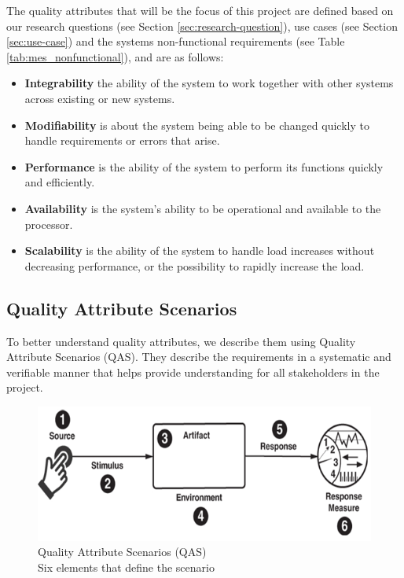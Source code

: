 The quality attributes that will be the focus of this project are defined based on our research questions (see Section \ref{sec:research-question}), use cases (see Section \ref{sec:use-case}) and the systems non-functional requirements (see Table \ref{tab:mes_nonfunctional}), and are as follows:
\begin{itemize}
    \item \textbf{Integrability} the ability of the system to work together with other systems across existing or new systems.
    \item \textbf{Modifiability} is about the system being able to be changed quickly to handle requirements or errors that arise.
    \item \textbf{Performance} is the ability of the system to perform its functions quickly and efficiently.
    \item \textbf{Availability} is the system's ability to be operational and available to the processor.
     \item \textbf{Scalability} is the ability of the system to handle load increases without decreasing performance, or the possibility to rapidly increase the load.
\end{itemize}





\subsection{Quality Attribute Scenarios}
To better understand quality attributes, we describe them using Quality Attribute Scenarios (QAS). They describe the requirements in a systematic and verifiable manner that helps provide understanding for all stakeholders in the project.

\begin{figure}[H]
    \centering
    \caption{\centering Quality Attribute Scenarios (QAS) \\ Six elements that define the scenario}
    \label{fig:qas-diagram}
    \includegraphics[width=0.93\linewidth]{images/qas.png} 
\end{figure}


